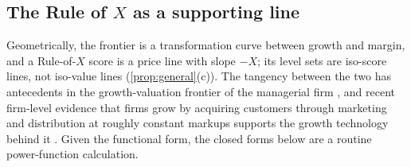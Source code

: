 \subsection{The Rule of \texorpdfstring{$X$}{X} as a supporting line}\label{sec:model-score}

Geometrically, the frontier is a transformation curve between growth and margin, and a Rule-of-$X$ score is a price line with slope $-X$; its level sets are iso-score lines, not iso-value lines (\autoref{prop:general}(c)). The tangency between the two has antecedents in the growth-valuation frontier of the managerial firm \citep{marris1964economic,solow1971some,odagiri1981theory}, and recent firm-level evidence that firms grow by acquiring customers through marketing and distribution at roughly constant markups supports the growth technology behind it \citep{fitzgerald2024how,argente2025how,afrouzi2023concentration}. Given the functional form, the closed forms below are a routine power-function calculation.

